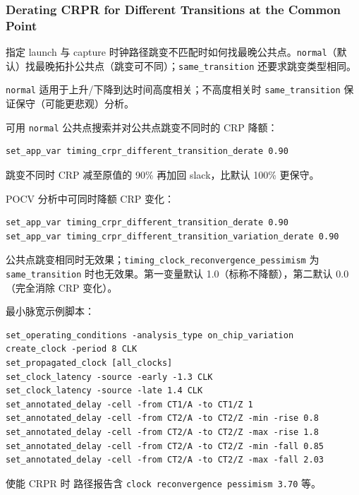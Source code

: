 \subsubsection*{Derating CRPR for Different Transitions at the Common Point}

 指定 launch 与 capture 时钟路径跳变不匹配时如何找最晚公共点。\texttt{normal}（默认）找最晚拓扑公共点（跳变可不同）；\texttt{same\_transition} 还要求跳变类型相同。


\texttt{normal} 适用于上升/下降到达时间高度相关；不高度相关时 \texttt{same\_transition} 保证保守（可能更悲观）分析。

可用 \texttt{normal} 公共点搜索并对公共点跳变不同时的 CRP 降额：
\begin{lstlisting}
set_app_var timing_crpr_different_transition_derate 0.90
\end{lstlisting}

跳变不同时 CRP 减至原值的 90\% 再加回 slack，比默认 100\% 更保守。

POCV 分析中可同时降额 CRP 变化：
\begin{lstlisting}
set_app_var timing_crpr_different_transition_derate 0.90
set_app_var timing_crpr_different_transition_variation_derate 0.90
\end{lstlisting}

公共点跳变相同时无效果；\texttt{timing\_clock\_reconvergence\_pessimism} 为 \texttt{same\_transition} 时也无效果。第一变量默认 1.0（标称不降额），第二默认 0.0（完全消除 CRP 变化）。

最小脉宽示例脚本：
\begin{lstlisting}
set_operating_conditions -analysis_type on_chip_variation
create_clock -period 8 CLK
set_propagated_clock [all_clocks]
set_clock_latency -source -early -1.3 CLK
set_clock_latency -source -late 1.4 CLK
set_annotated_delay -cell -from CT1/A -to CT1/Z 1
set_annotated_delay -cell -from CT2/A -to CT2/Z -min -rise 0.8
set_annotated_delay -cell -from CT2/A -to CT2/Z -max -rise 1.8
set_annotated_delay -cell -from CT2/A -to CT2/Z -min -fall 0.85
set_annotated_delay -cell -from CT2/A -to CT2/Z -max -fall 2.03
\end{lstlisting}

使能 CRPR 时  路径报告含 \texttt{clock reconvergence pessimism 3.70} 等。

